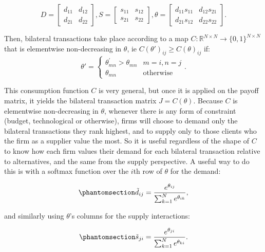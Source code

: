 \documentclass[
]{article}
\theoremstyle{plain}
\theoremstyle{definition}
\theoremstyle{remark}
\begin{document}
\[
D = 
\begin{bmatrix}
d_{11} & d_{12} \\
d_{21} & d_{22}
\end{bmatrix}
,
S = 
\begin{bmatrix}
s_{11} & s_{12} \\
s_{21} & s_{22}
\end{bmatrix}
,
\theta = 
\begin{bmatrix}
d_{11}s_{11} & d_{12}s_{21} \\
d_{21}s_{12} & d_{22}s_{22}
\end{bmatrix}.
\]

Then, bilateral transactions take place according to a map
\(C : \mathbb{R}^{N \times N} \to \{0, 1\}^{N \times N}\) that is
elementwise non-decreasing in \(\theta\), ie
\(C(\theta')_{ij} \geq C(\theta)_{ij}\) if: \[
\theta' = \begin{cases} \theta_{mn}^{'} > \theta_{mn} & m=i, n=j\\ \theta_{mn} & \text{otherwise} \end{cases}.
\]

This consumption function \(C\) is very general, but once it is applied
on the payoff matrix, it yields the bilateral transaction matrix
\(J = C(\theta)\). Because \(C\) is elementwise non-decreasing in
\(\theta\), whenever there is any form of constraint (budget,
technological or otherwise), firms will choose to demand only the
bilateral transactions they rank highest, and to supply only to those
clients who the firm as a supplier value the most. So it is useful
regardless of the shape of \(C\) to know how each firm values their
demand for each bilateral transaction relative to alternatives, and the
same from the supply perspective. A useful way to do this is with a
softmax function over the \(i\)th row of \(\theta\) for the demand:

\begin{equation}\phantomsection\label{eq-softmaxrow}{
\tilde{d}_{ij} = \frac{e^{\theta_{ij}}}{\sum_{k=1}^N e^{\theta_{ik}}},
}\end{equation}

and similarly using \(\theta\)'s columns for the supply interactions:

\begin{equation}\phantomsection\label{eq-softmaxcol}{
\tilde{s}_{ji} = \frac{e^{\theta_{ji}}}{\sum_{k=1}^N e^{\theta_{ki}}}.
}\end{equation}
\end{document}
